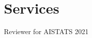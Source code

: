\documentclass[11pt]{article}
\begin{document}


\section*{Services}

\hspace{-.25em}\begin{itemize*}[itemjoin={{ $\bullet$}}, label={}]
\item Reviewer for AISTATS 2021
\end{itemize*}


\end{document}
